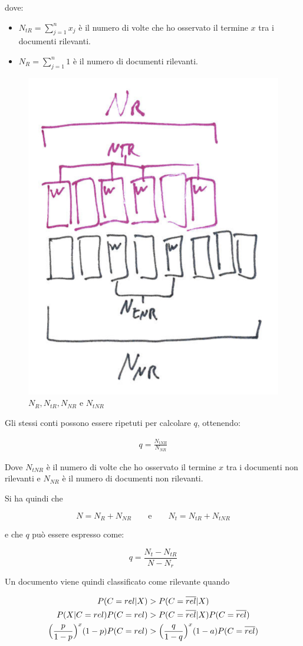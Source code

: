 \noindent dove:
\begin{itemize}
	\item $N_{tR} = \sum\limits_{j = 1}^n x_j$ è il numero di volte che ho osservato il termine $x$ tra i documenti rilevanti.
	\item $N_R = \sum\limits_{j = 1}^n 1$ è il numero di documenti rilevanti.
\end{itemize}

\begin{figure}[htbp]
	\centering
	\includegraphics[width=.35\textwidth]{images/l10-fig-1}
	\caption{$N_R, N_{tR}, N_{NR}$ e $N_{tNR}$}
\end{figure}

Gli stessi conti possono essere ripetuti per calcolare $q$, ottenendo:

\begin{align}
\boxed{q = \frac{N_{tNR}}{N_{NR}}}
\end{align}

\noindent Dove $N_{tNR}$ è il numero di volte che ho osservato il termine $x$ tra i documenti non rilevanti e $N_{NR}$ è il numero di documenti non rilevanti.

Si ha quindi che 

$$
N = N_R + N_{NR} \qquad \text{e} \qquad N_t = N_{tR} + N_{tNR}
$$

e che $q$ può essere espresso come:

$$
q = \frac{N_t - N_{tR}}{N - N_r}
$$

Un documento viene quindi classificato come rilevante quando

\begin{align*}
	P(C = rel | X) &> P(C = \overline{rel} | X)\\
	P(X | C=rel)P(C=rel) &> P(C = \overline{rel} |X)P(C = \overline{rel}) \\
	\Big( \frac{p}{1-p} \Big)^x(1-p) P(C = rel) &> \Big(\frac{q}{1-q}\Big)^x (1-a)P(C = \overline{rel})
\end{align*}

